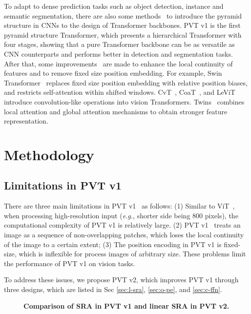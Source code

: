 \documentclass[10pt,twocolumn,letterpaper]{article}
\def\eg{\emph{e.g.}}
\begin{document}
	To adapt to dense prediction tasks such as object detection, instance and semantic segmentation, there are also some methods~\cite{pvt,swin,cvt,coat,levit,twins} to introduce the pyramid structure in CNNs to the design of Transformer backbones.
PVT v1 is the first pyramid structure Transformer, which presents a hierarchical Transformer with four stages, showing that a pure Transformer backbone can be as versatile as CNN counterparts and performs better in detection and segmentation tasks.
After that, some improvements~\cite{swin,cvt,coat,levit,twins} are made to enhance the local continuity of features and to remove fixed size position embedding.
For example, Swin Transformer~\cite{swin} replaces fixed size position embedding with relative position biases, and restricts self-attention within shifted windows.
CvT~\cite{cvt}, CoaT~\cite{coat}, and LeViT~\cite{levit} introduce convolution-like operations into vision Transformers.
	Twins~\cite{twins} combines local attention and global attention mechanisms to obtain stronger feature representation.
	
	
	\section{Methodology}
	
	\subsection{Limitations in PVT v1}
	There are three main limitations in PVT v1~\cite{pvt} as follows:
	(1) Similar to ViT~\cite{dosovitskiy2020image}, when processing high-resolution input (\eg,  shorter side being 800 pixels), the computational complexity of PVT v1 is relatively large.
	(2) PVT v1~\cite{pvt} treats an image as a sequence of non-overlapping patches, which loses the local continuity of the image to a certain extent;
(3) The position encoding in PVT v1 is fixed-size, which is inflexible for process images of arbitrary size.
These problems limit the performance of PVT v1 on vision tasks.
	
	To address these issues, we propose PVT v2, which improves PVT v1 through three designs, which are listed in Sec \ref{sec:l-sra}, \ref{sec:o-pe}, and \ref{sec:c-ffn}.
	
	\begin{figure}[t]
		\centering
		\setlength{\fboxrule}{0pt}
		\caption{\textbf{Comparison of SRA in PVT v1 and linear SRA in PVT v2.}}
		\label{fig:li_att}
	\end{figure}
	
\end{document}

